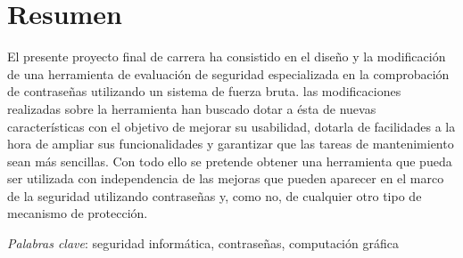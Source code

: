 \section*{Resumen}

El presente proyecto final de carrera ha consistido en el diseño y la modificación de una herramienta de evaluación de seguridad especializada en la comprobación de contraseñas utilizando un sistema de fuerza bruta. las modificaciones realizadas sobre la herramienta han buscado dotar a ésta de nuevas características con el objetivo de mejorar su usabilidad, dotarla de facilidades a la hora de ampliar sus funcionalidades y garantizar que las tareas de mantenimiento sean más sencillas. Con todo ello se pretende obtener una herramienta que pueda ser utilizada con independencia de las mejoras que pueden aparecer en el marco de la seguridad utilizando contraseñas y, como no, de cualquier otro tipo de mecanismo de protección.

\emph{Palabras clave}: seguridad informática, contraseñas, computación gráfica
